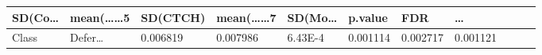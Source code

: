 \documentclass[
]{article}
\begin{document}
\begin{longtable}[]{@{}lllllllllll@{}}
\begin{minipage}[b]{0.06\columnwidth}
SD(Co\ldots{}\strut
\end{minipage} & \begin{minipage}[b]{0.09\columnwidth}\raggedright
mean(\ldots\ldots5\strut
\end{minipage} & \begin{minipage}[b]{0.06\columnwidth}\raggedright
SD(CTCH)\strut
\end{minipage} & \begin{minipage}[b]{0.09\columnwidth}\raggedright
mean(\ldots\ldots7\strut
\end{minipage} & \begin{minipage}[b]{0.06\columnwidth}\raggedright
SD(Mo\ldots{}\strut
\end{minipage} & \begin{minipage}[b]{0.06\columnwidth}\raggedright
p.value\strut
\end{minipage} & \begin{minipage}[b]{0.06\columnwidth}\raggedright
FDR\strut
\end{minipage} & \begin{minipage}[b]{0.03\columnwidth}\raggedright
\ldots{}\strut
\end{minipage}\tabularnewline
\midrule
\endhead
\begin{minipage}[t]{0.06\columnwidth}\raggedright
Class\strut
\end{minipage} & \begin{minipage}[t]{0.06\columnwidth}\raggedright
Defer\ldots{}\strut
\end{minipage} & \begin{minipage}[t]{0.09\columnwidth}\raggedright
0.006819\strut
\end{minipage} & \begin{minipage}[t]{0.06\columnwidth}\raggedright
0.007986\strut
\end{minipage} & \begin{minipage}[t]{0.09\columnwidth}\raggedright
6.43E-4\strut
\end{minipage} & \begin{minipage}[t]{0.06\columnwidth}\raggedright
0.001114\strut
\end{minipage} & \begin{minipage}[t]{0.09\columnwidth}\raggedright
0.002717\strut
\end{minipage} & \begin{minipage}[t]{0.06\columnwidth}\raggedright
0.001121\strut
\end{minipage} & \begin{minipage}[t]{0.06\columnwidth}\raggedright

\end{minipage}
\end{longtable}
\end{document}
